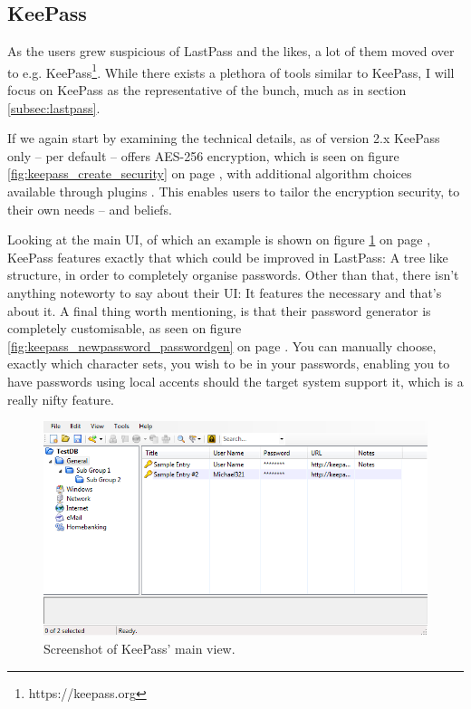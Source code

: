 		\subsection{KeePass}
			As the users grew suspicious of LastPass and the likes, a lot of them moved over to e.g. KeePass\footnote{https://keepass.org}. While there exists a plethora of tools similar to KeePass, I will focus on KeePass as the representative of the bunch, much as in section \ref{subsec:lastpass}.

			If we again start by examining the technical details, as of version 2.x KeePass only -- per default -- offers AES-256 encryption, which is seen on figure \ref{fig:keepass_create_security} on page \pageref{fig:keepass_create_security}, with additional algorithm choices available through plugins \cite{keepass_security}. This enables users to tailor the encryption security, to their own needs -- and beliefs. 

			Looking at the main UI, of which an example is shown on figure \ref{fig:keepass_main} on page \pageref{fig:keepass_main}, KeePass features exactly that which could be improved in LastPass: A tree like structure, in order to completely organise passwords. Other than that, there isn't anything noteworty to say about their UI: It features the necessary and that's about it. A final thing worth mentioning, is that their password generator is completely customisable, as seen on figure \ref{fig:keepass_newpassword_passwordgen} on page \pageref{fig:keepass_newpassword_passwordgen}. You can manually choose, exactly which character sets, you wish to be in your passwords, enabling you to have passwords using local accents should the target system support it, which is a really nifty feature.




			\begin{figure}[h!]
				\centering
				\includegraphics[width=\textwidth]{figures/analysis/keepass_mainview.png}
				\caption{Screenshot of KeePass' main view.}
				\label{fig:keepass_main}
			\end{figure}

